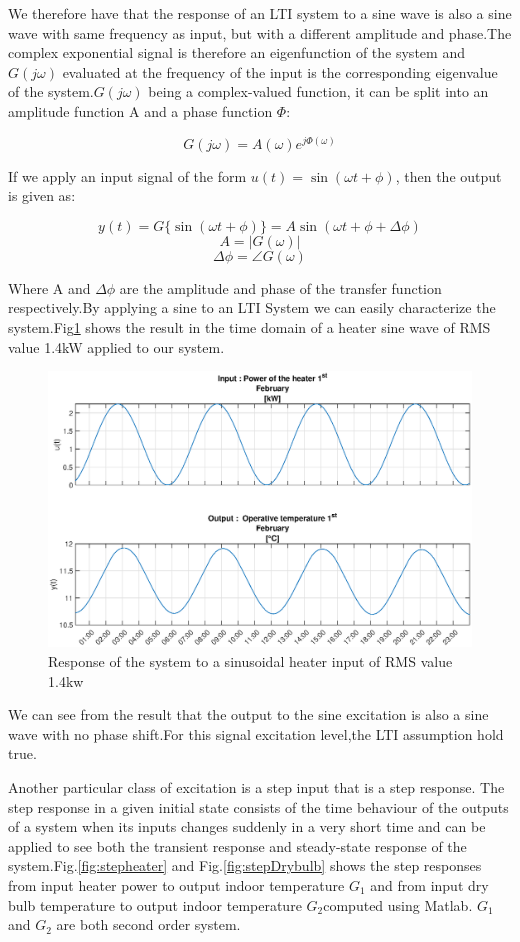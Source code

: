 \documentclass[a4paper,12pt]{report}
\numberwithin{equation}{section}
\begin{document}
We therefore have that the response of an LTI system to a sine wave is also a sine wave  with same
frequency as input, but with a different amplitude and phase.The complex exponential signal is therefore an eigenfunction of the system and $G(j \omega)$ evaluated at the frequency of the input is the corresponding eigenvalue of the system.$G(j \omega)$ being a complex-valued function, it can be split into an amplitude function A and a phase function $\Phi$:

\[G(j \omega)=A(\omega) e^{j \Phi(\omega)}\]

If we apply an input signal of the form $u(t)=\sin (\omega t+\phi)$, then the output is given as:


\[y(t)=G\{\sin (\omega t+\phi)\} =A \sin (\omega t+\phi+\Delta \phi)\]
\[A =|G(\omega)| \]
\[\Delta \phi =\angle G(\omega)\]

Where A and $\Delta \phi$ are  the amplitude  and phase of the transfer function respectively.By applying a sine to an LTI System we can easily characterize the system.Fig\ref{fig:single sine} shows the result in the time domain of a heater sine wave of RMS value 1.4kW applied to our system.

\begin{figure}[H]
    \includegraphics[width=\textwidth]{single_sine_rms_1400.eps}
    \caption{Response of the system to a sinusoidal heater input of RMS value 1.4kw}
    \label{fig:single sine}
\end{figure}

We can see from the result that the output to the sine excitation is also a sine wave with no phase shift.For this signal excitation level,the LTI assumption hold true.

Another particular class of excitation is a step input that is a step response. The step response in a given initial state consists of the time behaviour of the outputs of a  system when its inputs changes suddenly in a very short time and can be applied to see both the transient response and steady-state response of the system.Fig.\ref{fig:stepheater} and Fig.\ref{fig:stepDrybulb} shows the step responses from input heater power to output indoor temperature $G_{1}$ and from input dry bulb temperature to output indoor temperature $G_{2}$computed using Matlab. $G_{1}$ and $G_{2}$ are both second order system. 
\end{document}
